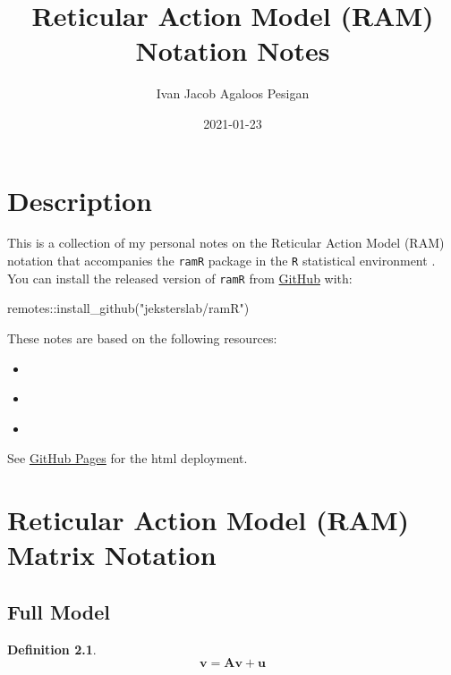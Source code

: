 \documentclass[
]{book}
\title{Reticular Action Model (RAM) Notation Notes}
\author{Ivan Jacob Agaloos Pesigan}
\date{2021-01-23}
\newenvironment{Shaded}{\begin{snugshade}}{\end{snugshade}}
\newcommand{\FunctionTok}[1]{\textcolor[rgb]{0.00,0.00,0.00}{#1}}
\newcommand{\NormalTok}[1]{#1}
\newcommand{\SpecialCharTok}[1]{\textcolor[rgb]{0.00,0.00,0.00}{#1}}
\newcommand{\StringTok}[1]{\textcolor[rgb]{0.31,0.60,0.02}{#1}}
\providecommand{\tightlist}{%
  \setlength{\itemsep}{0pt}\setlength{\parskip}{0pt}}
\theoremstyle{definition}
\newtheorem{definition}{Definition}[chapter]
\theoremstyle{definition}
\theoremstyle{definition}
\theoremstyle{remark}
\begin{document}
\maketitle

{
\setcounter{tocdepth}{1}
\tableofcontents
}
\hypertarget{description}{%
\chapter{Description}\label{description}}

This is a collection of my personal notes
on the Reticular Action Model (RAM) notation
that accompanies the \texttt{ramR} package \citep{R-ramR}
in the \texttt{R} statistical environment \citep{R-base}.
You can install the released version of \texttt{ramR}
from \href{https://github.com/jeksterslab/ramR}{GitHub} with:

\begin{Shaded}
\begin{Highlighting}[]
\NormalTok{remotes}\SpecialCharTok{::}\FunctionTok{install\_github}\NormalTok{(}\StringTok{"jeksterslab/ramR"}\NormalTok{)}
\end{Highlighting}
\end{Shaded}

These notes are based on the following resources:

\begin{itemize}
\tightlist
\item
  \citet{Boker-2005}
\item
  \citet{McArdle-1984}
\item
  \citet{McArdle-2005}
\end{itemize}

See \href{https://jeksterslab.github.io/ramR_notes/index.html}{GitHub Pages}
for the html deployment.

\hypertarget{ram-matrix-notation}{%
\chapter{Reticular Action Model (RAM) Matrix Notation}\label{ram-matrix-notation}}

\hypertarget{full-model}{%
\section{Full Model}\label{full-model}}

\begin{definition}
\protect\hypertarget{def:unnamed-chunk-2}{}{\label{def:unnamed-chunk-2} }\begin{equation}
  \mathbf{v}
  =
  \mathbf{A} \mathbf{v} + \mathbf{u}
\end{equation}
\end{definition}
\end{document}
